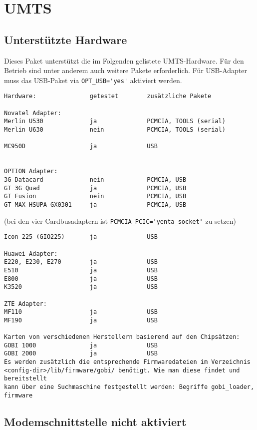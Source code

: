\section {UMTS}

\subsection{Unterstützte Hardware}

Dieses Paket unterstützt die im Folgenden gelistete UMTS-Hardware.
Für den Betrieb sind unter anderem auch weitere Pakete erforderlich.
Für USB-Adapter muss das USB-Paket via \verb+OPT_USB='yes'+ aktiviert werden.

\begin{verbatim}
Hardware:               getestet        zusätzliche Pakete

Novatel Adapter:
Merlin U530             ja              PCMCIA, TOOLS (serial)
Merlin U630             nein            PCMCIA, TOOLS (serial)

MC950D                  ja              USB


OPTION Adapter:
3G Datacard             nein            PCMCIA, USB
GT 3G Quad              ja              PCMCIA, USB
GT Fusion               nein            PCMCIA, USB
GT MAX HSUPA GX0301     ja              PCMCIA, USB
\end{verbatim}
(bei den vier Cardbusadaptern ist \verb+PCMCIA_PCIC='yenta_socket'+ zu setzen)

\begin{verbatim}
Icon 225 (GIO225)       ja              USB

Huawei Adapter:
E220, E230, E270        ja              USB
E510                    ja              USB
E800                    ja              USB
K3520                   ja              USB

ZTE Adapter:
MF110                   ja              USB
MF190                   ja              USB

Karten von verschiedenen Herstellern basierend auf den Chipsätzen:
GOBI 1000               ja              USB
GOBI 2000               ja              USB
Es werden zusätzlich die entsprechende Firmwaredateien im Verzeichnis
<config-dir>/lib/firmware/gobi/ benötigt. Wie man diese findet und bereitstellt
kann über eine Suchmaschine festgestellt werden: Begriffe gobi_loader, firmware
\end{verbatim}

\subsection{Modemschnittstelle nicht aktiviert}

